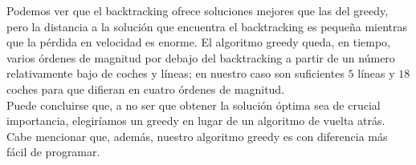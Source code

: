 \documentclass[a4paper, 11pt]{article}
\begin{document}
Podemos ver que el backtracking ofrece soluciones mejores que las del greedy, pero la distancia a la solución que encuentra el backtracking es pequeña mientras que la pérdida en velocidad es enorme. El algoritmo greedy queda, en tiempo, varios órdenes de magnitud por debajo del backtracking a partir de un número relativamente bajo de coches y líneas; en nuestro caso son suficientes $5$ líneas y $18$ coches para que difieran en cuatro órdenes de magnitud. \\

Puede concluirse que, a no ser que obtener la solución óptima sea de crucial importancia, elegiríamos un greedy en lugar de un algoritmo de vuelta atrás. Cabe mencionar que, además, nuestro algoritmo greedy es con diferencia más fácil de programar.
\end{document}
